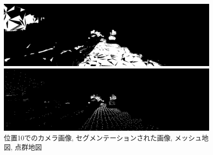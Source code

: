 \begin{figure}[htbp]
\begin{minipage}[b]{0.50\hsize}
\begin{center}
  \end{center}
 \end{minipage} \\
  \begin{minipage}[b]{0.50\hsize}
 \begin{center}
  \includegraphics[keepaspectratio, scale=0.18]{./picture/valued_mesh_map_image/image9.jpg}
  \end{center}
 \end{minipage}
 \begin{minipage}[b]{0.50\hsize}
 \begin{center}
  \includegraphics[keepaspectratio, scale=0.18]{./picture/valued_point_map_image/image9.jpg}
  \end{center}
 \end{minipage}
 \caption{位置10でのカメラ画像, セグメンテーションされた画像, メッシュ地図, 点群地図}\label{fig:place10}
\end{figure}

